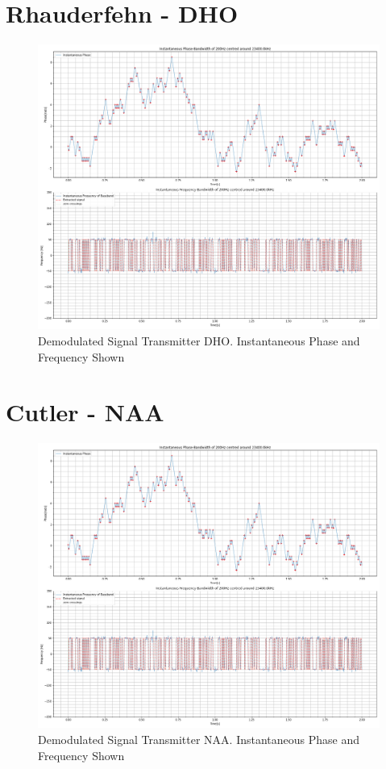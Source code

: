 \section{Rhauderfehn - \textbf{DHO}}
\begin{figure}[h!]
    \centering
    \includegraphics[width = \textwidth]{figs/AppB/DHO.png}
    \caption{Demodulated Signal Transmitter DHO. Instantaneous Phase and Frequency Shown}
    \label{fig:DHO}
\end{figure}
\newpage
\section{Cutler - \textbf{NAA}}
\begin{figure}[h!]
    \centering
    \includegraphics[width = \textwidth]{figs/AppB/NAA.png}
    \caption{Demodulated Signal Transmitter NAA. Instantaneous Phase and Frequency Shown}
    \label{fig:NAA}
\end{figure}